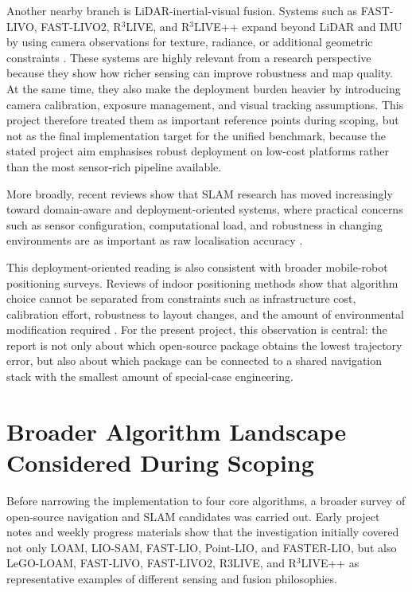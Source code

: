 \documentclass[12pt,a4paper]{report}
\begin{document}
Another nearby branch is LiDAR-inertial-visual fusion. Systems such as FAST-LIVO, FAST-LIVO2, R$^3$LIVE, and R$^3$LIVE++ expand beyond LiDAR and IMU by using camera observations for texture, radiance, or additional geometric constraints \citep{zheng2022fastlivo,zheng2024fastlivo2,lin2022r3live,lin2024r3livepp}. These systems are highly relevant from a research perspective because they show how richer sensing can improve robustness and map quality. At the same time, they also make the deployment burden heavier by introducing camera calibration, exposure management, and visual tracking assumptions. This project therefore treated them as important reference points during scoping, but not as the final implementation target for the unified benchmark, because the stated project aim emphasises robust deployment on low-cost platforms rather than the most sensor-rich pipeline available.

More broadly, recent reviews show that SLAM research has moved increasingly toward domain-aware and deployment-oriented systems, where practical concerns such as sensor configuration, computational load, and robustness in changing environments are as important as raw localisation accuracy \citep{yarovoi2024review}.

This deployment-oriented reading is also consistent with broader mobile-robot positioning surveys. Reviews of indoor positioning methods show that algorithm choice cannot be separated from constraints such as infrastructure cost, calibration effort, robustness to layout changes, and the amount of environmental modification required \citep{huang2023indoorpositioningreview}. For the present project, this observation is central: the report is not only about which open-source package obtains the lowest trajectory error, but also about which package can be connected to a shared navigation stack with the smallest amount of special-case engineering.

\section{Broader Algorithm Landscape Considered During Scoping}
Before narrowing the implementation to four core algorithms, a broader survey of open-source navigation and SLAM candidates was carried out. Early project notes and weekly progress materials show that the investigation initially covered not only LOAM, LIO-SAM, FAST-LIO, Point-LIO, and FASTER-LIO, but also LeGO-LOAM, FAST-LIVO, FAST-LIVO2, R3LIVE, and R$^3$LIVE++ as representative examples of different sensing and fusion philosophies.
\end{document}
